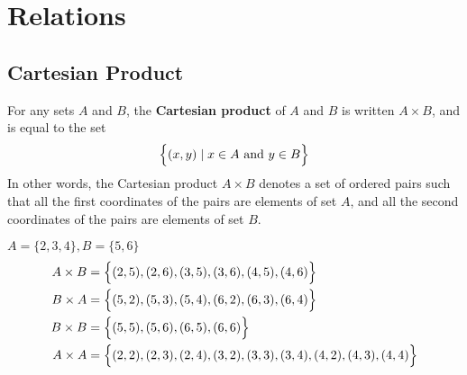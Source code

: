 \documentclass[../notes.tex]{subfiles}
\begin{document}
	\chapter{Relations}
		\section{Cartesian Product}
			For any sets $A$ and $B$, the \textbf{Cartesian product} of $A$ and $B$ is written $A \times B$, and is equal to the set
			\begin{align*}
				\Bigl\{(x, y) \mid x \in A \text{ and } y \in B\Bigr\}
			\end{align*}
			In other words, the Cartesian product $A \times B$ denotes a set of ordered pairs such that all the first coordinates of the pairs are elements of set $A$, and all the second coordinates of the pairs are elements of set $B$.
			\begin{examplebox}
				$A = \{2, 3, 4\}, B = \{5, 6\}$
				\begin{align*}
					A \times B &= \Bigl\{(2, 5), (2, 6), (3, 5), (3, 6), (4, 5), (4, 6)\Bigr\}\\
					B \times A &= \Bigl\{(5, 2), (5, 3), (5, 4), (6, 2), (6, 3), (6, 4)\Bigr\}\\
					B \times B &= \Bigl\{(5, 5), (5, 6), (6, 5), (6, 6)\Bigr\}\\
					A \times A &= \Bigl\{(2, 2), (2, 3), (2, 4), (3, 2), (3, 3), (3, 4), (4, 2), (4, 3), (4, 4)\Bigr\}
				\end{align*}
			\end{examplebox}
\end{document}
